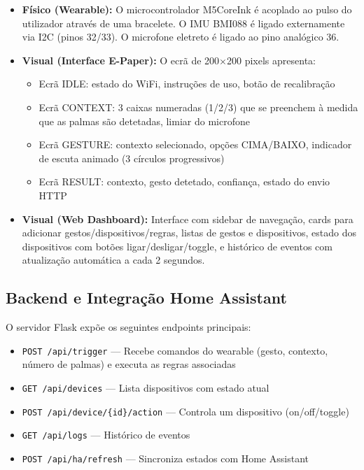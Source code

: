 \documentclass[11pt, a4paper]{article}
\begin{document}
\begin{itemize}
    \item \textbf{Físico (Wearable):} O microcontrolador M5CoreInk é acoplado ao pulso do utilizador através de uma bracelete. O IMU BMI088 é ligado externamente via I2C (pinos 32/33). O microfone eletreto é ligado ao pino analógico 36.
    \item \textbf{Visual (Interface E-Paper):} O ecrã de 200$\times$200 pixels apresenta:
    \begin{itemize}
        \item Ecrã IDLE: estado do WiFi, instruções de uso, botão de recalibração
        \item Ecrã CONTEXT: 3 caixas numeradas (1/2/3) que se preenchem à medida que as palmas são detetadas, limiar do microfone
        \item Ecrã GESTURE: contexto selecionado, opções CIMA/BAIXO, indicador de escuta animado (3 círculos progressivos)
        \item Ecrã RESULT: contexto, gesto detetado, confiança, estado do envio HTTP
    \end{itemize}
    \item \textbf{Visual (Web Dashboard):} Interface com sidebar de navegação, cards para adicionar gestos/dispositivos/regras, listas de gestos e dispositivos, estado dos dispositivos com botões ligar/desligar/toggle, e histórico de eventos com atualização automática a cada 2 segundos.
\end{itemize}

\subsection{Backend e Integração Home Assistant}

O servidor Flask expõe os seguintes endpoints principais:

\begin{itemize}
    \item \texttt{POST /api/trigger} — Recebe comandos do wearable (gesto, contexto, número de palmas) e executa as regras associadas
    \item \texttt{GET /api/devices} — Lista dispositivos com estado atual
    \item \texttt{POST /api/device/\{id\}/action} — Controla um dispositivo (on/off/toggle)
    \item \texttt{GET /api/logs} — Histórico de eventos
    \item \texttt{POST /api/ha/refresh} — Sincroniza estados com Home Assistant
\end{itemize}
\end{document}
